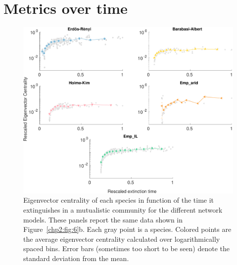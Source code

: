 \section{Metrics over time} \label{SI:2}
\begin{figure}[h]
    \centering
    \includegraphics[width=\textwidth]{figures/chp2/figSI2_mut.pdf}
    \caption[Evolution of the eigenvector centrality of extinct species]{Eigenvector centrality of each species in function of the time it extinguishes in a mutualistic community for the different network models. These panels report the same data shown in Figure~\ref{chp2:fig:6}b. Each gray point is a species. Colored points are the average eigenvector centrality calculated over logarithmically spaced bins. Error bars (sometimes too short to be seen) denote the standard deviation from the mean.}
    \label{chp2:fig:SI2_mut}
\end{figure}

